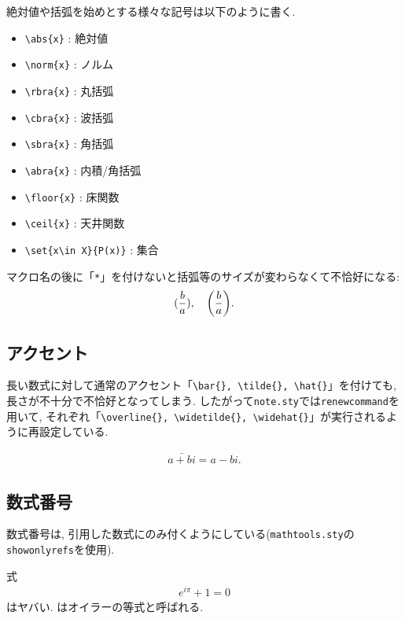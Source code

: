 \documentclass[
	paper=a4,
	fontsize=10pt, %
	jafontsize=12Q,
	jafontscale=0.92,
]{jlreq}
\begin{document}
絶対値や括弧を始めとする様々な記号は以下のように書く.

\begin{itemize}
    \item \verb|\abs{x}| : 絶対値
    \item \verb|\norm{x}| : ノルム
    \item \verb|\rbra{x}| : 丸括弧
    \item \verb|\cbra{x}| : 波括弧
    \item \verb|\sbra{x}| : 角括弧
    \item \verb|\abra{x}| : 内積/角括弧
    \item \verb|\floor{x}| : 床関数
    \item \verb|\ceil{x}| : 天井関数
    \item \verb|\set{x\in X}{P(x)}| : 集合
\end{itemize}

\begin{rem}{}{}
	マクロ名の後に「\texttt{*}」を付けないと括弧等のサイズが変わらなくて不恰好になる:
	\begin{align}
		\rbra{\frac{b}{a}}, \quad \rbra*{\frac{b}{a}}.
	\end{align}
\end{rem}

\subsection{アクセント}

長い数式に対して通常のアクセント「\verb|\bar{}, \tilde{}, \hat{}|」を付けても, 長さが不十分で不恰好となってしまう.
したがって\texttt{note.sty}では\texttt{renewcommand}を用いて, それぞれ「\verb|\overline{}, \widetilde{}, \widehat{}|」が実行されるように再設定している.

\begin{ex}{}{}
	\begin{align}
		\bar{a+bi}=a-bi.
	\end{align}
\end{ex}

\subsection{数式番号}

数式番号は, 引用した数式にのみ付くようにしている(\texttt{mathtools.sty}の\texttt{showonlyrefs}を使用).

\begin{ex}{}{}
	式
	\begin{align}
		e^{i\pi}+1=0 \label{Euler}
	\end{align}
	はヤバい. はオイラーの等式と呼ばれる.
\end{ex}
\end{document}
